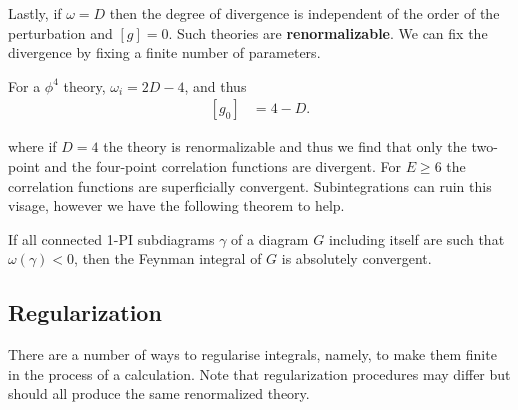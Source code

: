 Lastly, if $\omega = D$ then the degree of divergence is independent of the order of the perturbation and $\left[ g \right] = 0$. Such theories are \textbf{renormalizable}. We can fix the divergence by fixing a finite number of parameters.

\begin{example}
    For a $\phi^{4}$ theory, $\omega_i = 2D - 4$, and thus
    \begin{align*}
        \left[ g_0 \right] &= 4 - D
    .\end{align*}
\end{example}

where if $D = 4$ the theory is renormalizable and thus we find that only the two-point and the four-point correlation functions are divergent. For $E \geq 6$ the correlation functions are superficially convergent. Subintegrations can ruin this visage, however we have the following theorem to help.

\begin{theorem}
    If all connected 1-PI subdiagrams $\gamma$ of a diagram $G$ including itself are such that $\omega \left( \gamma \right) < 0$, then the Feynman integral of $G$ is absolutely convergent.
\end{theorem}

\subsection{Regularization}

There are a number of ways to regularise integrals, namely, to make them finite in the process of a calculation. Note that regularization procedures may differ but should all produce the same renormalized theory.


